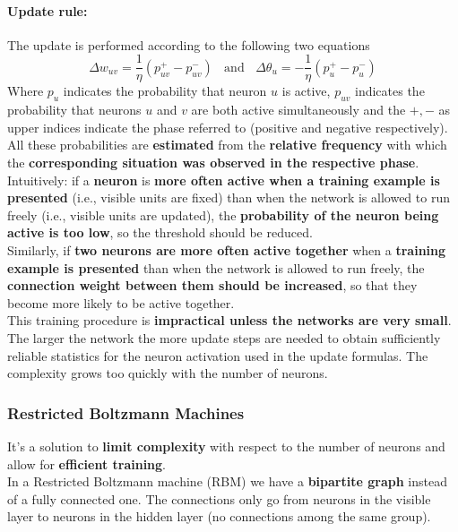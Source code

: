 \documentclass[11pt]{article}
\begin{document}
		\paragraph{Update rule:} The update is performed according to the following two equations
		$$ \Delta w_{uv} = \frac{1}{\eta} \left(p_{uv}^+ - p_{uv}^-\right) \;\; \text{ and } \;\; \Delta \theta_u = - \frac{1}{\eta} \left(p_u^+ - p_u^-\right) $$
		Where $p_u$ indicates the probability that neuron $u$ is active, $p_{uv}$ indicates the probability that neurons $u$ and $v$ are both active simultaneously and the $+, -$ as upper indices indicate the phase referred to (positive and negative respectively).\\
		
		All these probabilities are \textbf{estimated} from the \textbf{relative frequency} with which the \textbf{corresponding situation was observed in the respective phase}.\\
		
		Intuitively: if a \textbf{neuron} is \textbf{more often active when a training example is presented} (i.e., visible units are fixed) than when the network is allowed to run freely (i.e., visible units are updated), the \textbf{probability of the neuron being active is too low}, so the threshold should be reduced.\\
		Similarly, if \textbf{two neurons are more often active together} when a \textbf{training example is presented} than when the network is allowed to run freely, the \textbf{connection weight between them should be increased}, so that they become more likely to be active together. \\
		
		This training procedure is \textbf{impractical unless the networks are very small}. The larger the network the more update steps are needed to obtain sufficiently reliable statistics for the neuron activation used in the update formulas. The complexity grows too quickly with the number of neurons.\\
		
		\newpage
		
		\subsubsection{Restricted Boltzmann Machines}
		It's a solution to \textbf{limit complexity} with respect to the number of neurons and allow for \textbf{efficient training}.\\
		
		In a Restricted Boltzmann machine (RBM) we have a \textbf{bipartite graph} instead of a fully connected one. The connections only go from neurons in the visible layer to neurons in the hidden layer (no connections among the same group).
		
\end{document}

